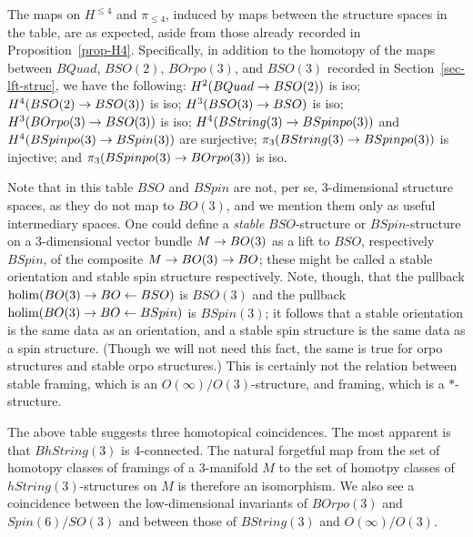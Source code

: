\documentclass{amsart}
\begin{document}
The maps on $H^{\leq 4}$ and $\pi_{\leq 4}$, induced by maps between the structure spaces in the table, are as expected, aside from those already recorded in Proposition~\ref{prop-H4}.  Specifically, in addition to the homotopy of the maps between $BQuad$, $BSO(2)$, $BOrpo(3)$, and $BSO(3)$ recorded in Section~\ref{sec-lft-struc}, we have the following: $H^2(BQuad \rightarrow BSO(2))$ is iso; $H^4(BSO(2) \rightarrow BSO(3))$ is iso; $H^3(BSO(3) \rightarrow BSO)$ is iso; $H^3(BOrpo(3) \rightarrow BSO(3))$ is iso; $H^4(BString(3) \rightarrow BSpinpo(3))$ and $H^4(BSpinpo(3) \rightarrow BSpin(3))$ are surjective; $\pi_3(BString(3) \rightarrow BSpinpo(3))$ is injective; and $\pi_3(BSpinpo(3) \rightarrow BOrpo(3))$ is iso. %

Note that in this table $BSO$ and $BSpin$ are not, per se, 3-dimensional structure spaces, as they do not map to $BO(3)$, and we mention them only as useful intermediary spaces.  One could define a \emph{stable} $BSO$-structure or $BSpin$-structure on a 3-dimensional vector bundle $M \rightarrow BO(3)$ as a lift to $BSO$, respectively $BSpin$, of the composite $M \rightarrow BO(3) \rightarrow BO$; these might be called a stable orientation and stable spin structure respectively.  Note, though, that the pullback $\operatorname{holim}(BO(3) \rightarrow BO \leftarrow BSO)$ is $BSO(3)$ and the pullback $\operatorname{holim}(BO(3) \rightarrow BO \leftarrow BSpin)$ is $BSpin(3)$; it follows that a stable orientation is the same data as an orientation, and a stable spin structure is the same data as a spin structure.  (Though we will not need this fact, the same is true for orpo structures and stable orpo structures.)  This is certainly not the relation between stable framing, which is an $O(\infty)/O(3)$-structure, and framing, which is a $*$-structure.

The above table suggests three homotopical coincidences.  The most apparent is that $BhString(3)$ is 4-connected.  The natural forgetful map from the set of homotopy classes of framings of a 3-manifold $M$ to the set of homotpy classes of $hString(3)$-structures on $M$ is therefore an isomorphism.  We also see a coincidence between the low-dimensional invariants of $BOrpo(3)$ and $Spin(6)/SO(3)$ and between those of $BString(3)$ and $O(\infty)/O(3)$.
\end{document}
